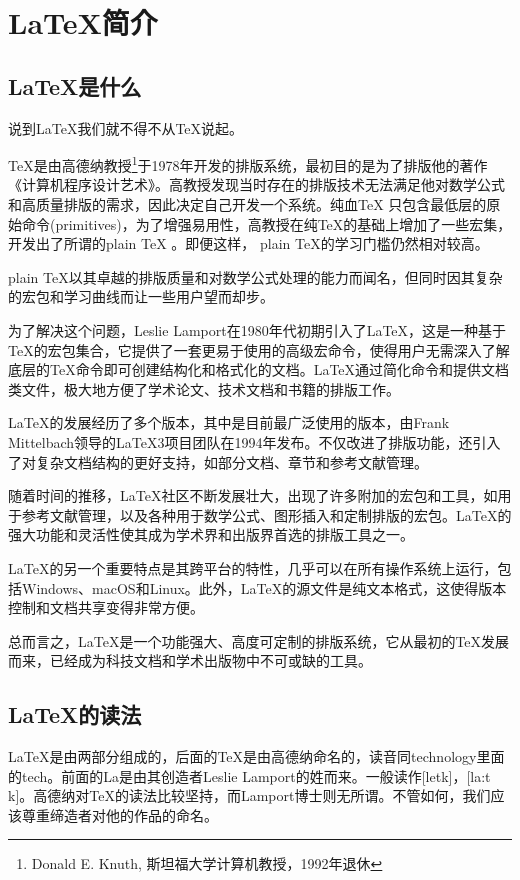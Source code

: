 \chapter{\LaTeX  简介}
\section{\LaTeX 是什么}
说到\LaTeX 我们就不得不从\TeX 说起。

\TeX 是由高德纳教授\footnote{Donald E. Knuth,
	斯坦福大学计算机教授，1992年退休}于1978年开发的排版系统，最初目的是为了排版他的著作《计算机程序设计艺术》。高教授发现当时存在的排版技术无法满足他对数学公式和高质量排版的需求，因此决定自己开发一个系统。纯血\TeX
只包含最低层的原始命令(primitives)，为了增强易用性，高教授在纯\TeX 的基础上增加了一些宏集，开发出了所谓的plain \TeX
。即便这样，
plain \TeX 的学习门槛仍然相对较高。

plain \TeX 以其卓越的排版质量和对数学公式处理的能力而闻名，但同时因其复杂的宏包和学习曲线而让一些用户望而却步。

为了解决这个问题，Leslie Lamport在1980年代初期引入了\LaTeX ，这是一种基于\TeX 的宏包集合，它提供了一套更易于使用的高级宏命令，使得用户无需深入了解底层的\TeX 命令即可创建结构化和格式化的文档。\LaTeX 通过简化命令和提供文档类文件，极大地方便了学术论文、技术文档和书籍的排版工作。

\LaTeX 的发展经历了多个版本，其中\LaTeXe 是目前最广泛使用的版本，由Frank Mittelbach领导的\LaTeX 3项目团队在1994年发布。\LaTeXe 不仅改进了排版功能，还引入了对复杂文档结构的更好支持，如部分文档、章节和参考文献管理。

随着时间的推移，\LaTeX 社区不断发展壮大，出现了许多附加的宏包和工具，如用于参考文献管理，以及各种用于数学公式、图形插入和定制排版的宏包。\LaTeX 的强大功能和灵活性使其成为学术界和出版界首选的排版工具之一。

\LaTeX 的另一个重要特点是其跨平台的特性，几乎可以在所有操作系统上运行，包括Windows、macOS和Linux。此外，\LaTeX 的源文件是纯文本格式，这使得版本控制和文档共享变得非常方便。

总而言之，\LaTeX 是一个功能强大、高度可定制的排版系统，它从最初的\TeX 发展而来，已经成为科技文档和学术出版物中不可或缺的工具。

\section{\LaTeX 的读法}
\LaTeX 是由两部分组成的，后面的\TeX 是由高德纳命名的，读音同technology里面的tech。前面的La是由其创造者Leslie
Lamport的姓而来。一般读作[\textquotesingle le\textsci t\textepsilon k]，[\textquotesingle la:t\textepsilon
k]。高德纳对\TeX 的读法比较坚持，而Lamport博士则无所谓。不管如何，我们应该尊重缔造者对他的作品的命名。

